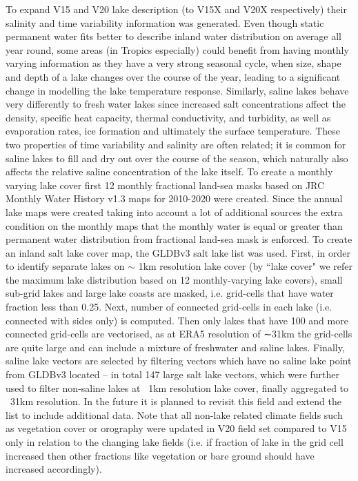 \documentclass[hess, twostagejnl]{copernicus}
\providecommand{\DIFadd}[1]{{\protect\color{blue} \sf #1}} %
\begin{document}
\DIFadd{To expand V15 and V20 lake description (to V15X and V20X respectively) their salinity and time variability information was generated. Even though static permanent water fits better to describe inland water distribution on average all year round, some areas (in Tropics especially) could  benefit from having monthly varying information as they have a very strong seasonal cycle, when size, shape and depth of a lake changes over the course of the year, leading to a significant change in modelling the lake temperature response. Similarly, saline lakes behave very differently to fresh water lakes since increased salt concentrations affect the density, specific heat capacity, thermal conductivity, and turbidity, as well as evaporation rates, ice formation and ultimately the surface temperature. These two properties of time variability and salinity are often related; it is common for saline lakes to fill and dry out over the course of the season, which naturally also affects the relative saline concentration of the lake itself. To create a monthly varying lake cover first 12 monthly fractional land-sea masks based on JRC Monthly Water History v1.3 maps for 2010-2020 were created. Since the annual lake maps were created taking into account a lot of additional sources the extra condition on the monthly maps that the monthly water is equal or greater than permanent water distribution from fractional land-sea mask is enforced. To create an inland salt lake cover map, the GLDBv3 salt lake list was used. First, in order to identify separate lakes on $\sim$ 1km resolution lake cover (by ``lake cover" we refer the maximum lake distribution based on 12 monthly-varying lake covers), small sub-grid lakes and large lake coasts are masked, i.e. grid-cells that have water fraction less than 0.25. Next, number of connected grid-cells in each lake (i.e. connected with sides only) is computed. Then only lakes that have 100 and more connected grid-cells are vectorised, as at ERA5 resolution of ∼31km the grid-cells are quite large and can include a mixture of freshwater and saline lakes. Finally, saline lake vectors are selected by filtering vectors which have no saline lake point from GLDBv3 located – in total 147 large salt lake vectors, which were further used to filter non-saline lakes at ~1km resolution lake cover, finally aggregated to ~31km resolution. In the future it is planned to revisit this field and extend the list to include additional data. Note that all non-lake related climate fields such as vegetation cover or orography were updated in V20 field set compared to V15 only in relation to the changing lake fields (i.e. if fraction of lake in the grid cell increased then other fractions like vegetation or bare ground should have increased accordingly). 

}
\end{document}
